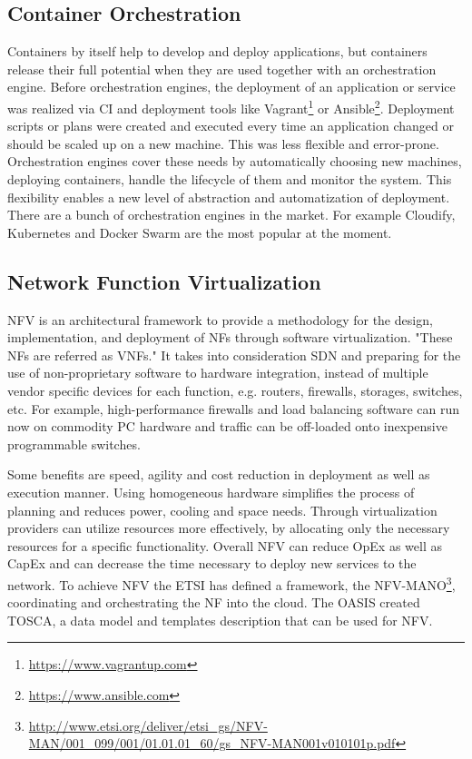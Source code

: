 \subsection{Container Orchestration}
Containers by itself help to develop and deploy applications, but containers release their full potential when they are used together with an orchestration engine.
Before orchestration engines, the deployment of an application or service was realized via \ac{CI} and deployment tools like Vagrant\footnote{\url{https://www.vagrantup.com}} or Ansible\footnote{\url{https://www.ansible.com}}.
Deployment scripts or plans were created and executed every time an application changed or should be scaled up on a new machine.\autocite[vf.][p. 70]{Tosatto:2015}
This was less flexible and error-prone.
Orchestration engines cover these needs by automatically choosing new machines, deploying containers, handle the lifecycle of them and monitor the system.\autocite[vf.][p. 70]{Tosatto:2015}
This flexibility enables a new level of abstraction and automatization of deployment.\autocite[vf.][p. 70]{Tosatto:2015}
There are a bunch of orchestration engines in the market.
For example Cloudify, Kubernetes and Docker Swarm are the most popular at the moment.


\subsection{Network Function Virtualization}
\ac{NFV} is an architectural framework to provide a methodology for the design, implementation, and deployment of \acp{NF} through software virtualization.\autocite[cf.][p. 8]{ETSI:NFV:2013}\autocite[cf.]{Rivenes:2014}
"These \acp{NF} are referred as \acp{VNF}."\autocite[p. 8]{ETSI:NFV:2013}
It takes into consideration \ac{SDN} and preparing for the use of non-proprietary software to hardware integration, instead of multiple vendor specific devices for each function, e.g. routers, firewalls, storages, switches, etc.\autocite[cf.]{Rivenes:2014}
For example, high-performance firewalls and load balancing software can run now on commodity PC hardware and traffic can be off-loaded onto inexpensive programmable switches.\autocite[cf.]{Noble:2015}

Some benefits are speed, agility and cost reduction in deployment as well as execution manner.\autocite[cf.]{Noble:2015}
Using homogeneous hardware simplifies the process of planning and reduces power, cooling and space needs.\autocite[cf.]{Noble:2015}
Through virtualization providers can utilize resources more effectively, by allocating only the necessary resources for a specific functionality.\autocite[cf.]{Noble:2015}
Overall \ac{NFV} can reduce \ac{OpEx} as well as \ac{CapEx} and can decrease the time necessary to deploy new services to the network.\autocite[cf.]{Noble:2015}
To achieve \ac{NFV} the \ac{ETSI} has defined a framework, the \ac{NFV-MANO}\footnote{\url{http://www.etsi.org/deliver/etsi_gs/NFV-MAN/001_099/001/01.01.01_60/gs_NFV-MAN001v010101p.pdf}}, coordinating and orchestrating the \ac{NF} into the cloud.
The \ac{OASIS} created \ac{TOSCA}, a data model and templates description that can be used for \ac{NFV}.

